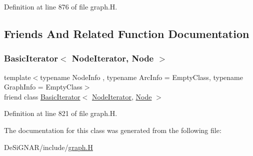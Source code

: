 Definition at line 876 of file graph.\+H.



\subsection{Friends And Related Function Documentation}
\mbox{\label{class_designar_1_1_graph_1_1_node_iterator_a21dc6ae614d097ff896e9e8e422d8f3c}} 
\subsubsection{\texorpdfstring{Basic\+Iterator$<$ Node\+Iterator, Node $>$}{BasicIterator< NodeIterator, Node >}}
{\footnotesize\ttfamily template$<$typename Node\+Info , typename Arc\+Info  = Empty\+Class, typename Graph\+Info  = Empty\+Class$>$ \\
friend class \hyperlink{class_designar_1_1_basic_iterator}{Basic\+Iterator}$<$ \hyperlink{class_designar_1_1_graph_1_1_node_iterator}{Node\+Iterator}, \hyperlink{class_designar_1_1_graph_a5dfc7dba9d092ac489c72e40390c37d0}{Node} $>$\hspace{0.3cm}{\ttfamily [friend]}}



Definition at line 821 of file graph.\+H.



The documentation for this class was generated from the following file\+:\begin{DoxyCompactItemize}
\item 
De\+Si\+G\+N\+A\+R/include/\hyperlink{graph_8_h}{graph.\+H}\end{DoxyCompactItemize}
